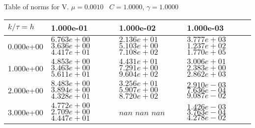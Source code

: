 \begin{center}
Table of norms for V. $\mu = 0.0010$ \, $C = 1.0000$, $\gamma = 1.0000$
  
\begin{tabular}{|p{1in}|p{1in}|p{1in}|p{1in}|} \hline
$k / \tau = h$ &1.000e-01 &1.000e-02 &1.000e-03 \\ \hline 
0.000e+00 & $6.763e+00$  $3.636e+00$  $4.417e+01$  & $2.136e+01$  $5.103e+00$  $7.108e+02$  & $3.777e+03$  $1.237e+02$  $1.770e+05$  \\ \hline 
1.000e+00 & $4.853e+00$  $3.463e+00$  $5.611e+01$  & $4.431e+01$  $7.291e+00$  $9.604e+02$  & $3.006e+01$  $2.383e+00$  $2.862e+03$  \\ \hline 
2.000e+00 & $8.483e+00$  $3.894e+00$  $4.328e+01$  & $3.256e+01$  $5.907e+00$  $8.720e+02$  & $2.910e-03$  $7.636e-04$  $9.087e-02$  \\ \hline 
3.000e+00 & $4.772e+00$  $2.709e+00$  $4.447e+01$  & $nan$  $nan$  $nan$  & $1.426e-03$  $3.763e-04$  $4.278e-02$  \\ \hline 

\end{tabular}\\[20pt]
\end{center}
